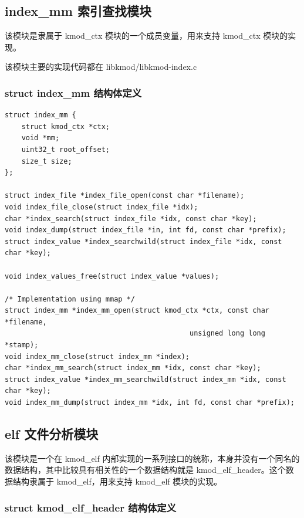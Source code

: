 \subsection{index\_mm 索引查找模块}

该模块是隶属于 kmod\_ctx 模块的一个成员变量，用来支持 kmod\_ctx
模块的实现。

该模块主要的实现代码都在 libkmod/libkmod-index.c

\subsubsection{struct index\_mm 结构体定义}

{\begin{shaded}\begin{verbatim}
struct index_mm {
    struct kmod_ctx *ctx;
    void *mm;
    uint32_t root_offset;
    size_t size;
};

struct index_file *index_file_open(const char *filename);
void index_file_close(struct index_file *idx);
char *index_search(struct index_file *idx, const char *key);
void index_dump(struct index_file *in, int fd, const char *prefix);
struct index_value *index_searchwild(struct index_file *idx, const char *key);

void index_values_free(struct index_value *values);

/* Implementation using mmap */
struct index_mm *index_mm_open(struct kmod_ctx *ctx, const char *filename,
                                            unsigned long long *stamp);
void index_mm_close(struct index_mm *index);        
char *index_mm_search(struct index_mm *idx, const char *key);
struct index_value *index_mm_searchwild(struct index_mm *idx, const char *key);
void index_mm_dump(struct index_mm *idx, int fd, const char *prefix);
\end{verbatim}\end{shaded}}
\subsection{elf 文件分析模块}

该模块是一个在 kmod\_elf
内部实现的一系列接口的统称，本身并没有一个同名的数据结构，其中比较具有相关性的一个数据结构就是
kmod\_elf\_header。这个数据结构隶属于 kmod\_elf，用来支持 kmod\_elf
模块的实现。

\subsubsection{struct kmod\_elf\_header 结构体定义}

